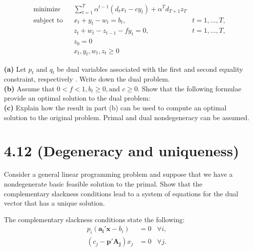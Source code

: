 \documentclass{article}
\begin{document}
\begin{equation*}
\begin{aligned}
& \text{minimize} && \displaystyle \sum_{t=1}^T \alpha^{t-1} (d_t x_t - c y_t) + \alpha^T d_{T+1} z_T\\
& \text{subject to} && x_t + y_t - w_t = b_t, \; & t = 1, \dots, T, \\
&&& z_t + w_t - z_{t-1} - fy_t = 0, & t = 1, \dots, T, \\
&&& z_0 = 0 \\
&&& x_t, y_t, w_t, z_t \geq 0
\end{aligned}
\end{equation*}

\noindent \textbf{(a)} Let $p_t$ and $q_t$ be dual variables associated with the first and second equality constraint, respectively .  Write down the dual problem. \\

\noindent \textbf{(b)} Assume that $ 0 < f < 1, b_t \geq 0, \text{and } c \geq 0$.  Show that the following formulae provide an optimal solution to the dual problem: \\

\noindent \textbf{(c)} Explain how the result in part (b) can be used to compute an optimal solution to the original problem.  Primal and dual nondegeneracy can be assumed. \\


\section*{4.12 (Degeneracy and uniqueness)}
Consider a general linear programming problem and suppose that we have a nondegenerate basic feasible solution to the primal.  Show that the complementary slackness conditions lead to a system of equations for the dual vector that has a unique solution.\\

\noindent

The complementary slackness conditions state the following:\\

\begin{equation*}
\begin{aligned}
p_i (\mathbf{a_i'x} - b_i) & = 0 \; \; \; \forall i, \\
(c_j - \mathbf{p' A_j}) x_j & = 0 \; \; \; \forall j.
\end{aligned}
\end{equation*}
\end{document}
